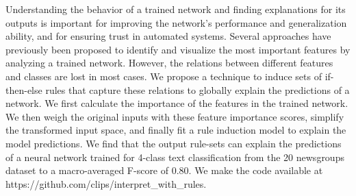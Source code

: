 Understanding the behavior of a trained network and finding explanations for its outputs is important for improving the network's performance and generalization ability, and for ensuring trust in automated systems. Several approaches have previously been proposed to identify and visualize the most important features by analyzing a trained network. However, the relations between different features and classes are lost in most cases. We propose a technique to induce sets of if-then-else rules that capture these relations to globally explain the predictions of a network. We first calculate the importance of the features in the trained network. We then weigh the original inputs with these feature importance scores, simplify the transformed input space, and finally fit a rule induction model to explain the model predictions. We find that the output rule-sets can explain the predictions of a neural network trained for 4-class text classification from the 20 newsgroups dataset to a macro-averaged F-score of 0.80. We make the code available at https://github.com/clips/interpret\_with\_rules.
